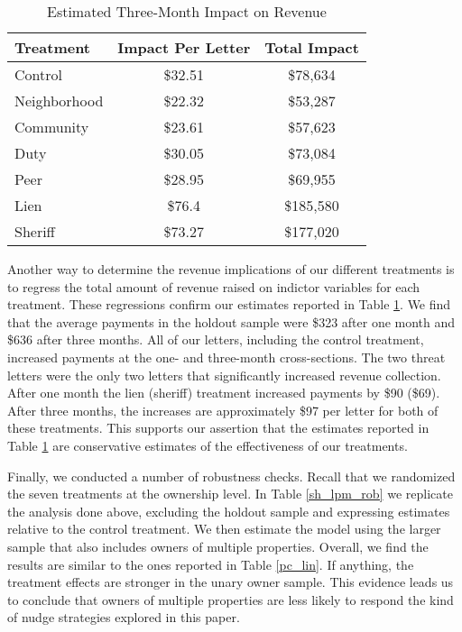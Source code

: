 \documentclass[12pt]{article}
\begin{document}
\begin{table}[htbp]
\caption{Estimated Three-Month Impact on Revenue}\label{sh_rev}
\bigskip
\centering
\begin{tabular}{lcc}
  \hline
Treatment & Impact Per Letter & Total Impact \\ 
  \hline
Control & \$32.51 & \$78,634 \\ 
  Neighborhood & \$22.32 & \$53,287 \\ 
  Community & \$23.61 & \$57,623 \\ 
  Duty & \$30.05 & \$73,084 \\ 
  Peer & \$28.95 & \$69,955 \\ 
  Lien & \$76.4 & \$185,580 \\ 
  Sheriff & \$73.27 & \$177,020 \\ 
   \hline
\end{tabular}
\end{table}

Another way to determine the revenue implications of our different
treatments is to regress the total amount of revenue raised on 
indictor variables for each treatment.  These regressions confirm our estimates
reported in Table \ref{sh_rev}. We find that the average payments in
the holdout sample were \$323 after one month and \$636 after three
months. All of our letters, including the control treatment, increased
payments at the one- and three-month cross-sections. The two threat letters
were the only two letters that significantly increased revenue
collection. After one month the lien (sheriff) treatment increased
payments by \$90 (\$69). After three months, the increases are
approximately \$97 per letter for both of these treatments. 
This supports our assertion 
that the estimates reported in Table \ref{sh_rev} are conservative
estimates of the effectiveness of our treatments.


Finally, we conducted a number of robustness checks. Recall that we
randomized the seven treatments at the ownership level. In Table
\ref{sh_lpm_rob} we replicate the analysis done above, excluding the
holdout sample and expressing estimates relative to the 
control treatment. We then estimate the model using the larger sample
that also includes owners of multiple properties. Overall, we find the
results are similar to the ones reported in Table \ref{pc_lin}. If
anything, the treatment effects are stronger in the unary owner
sample. This evidence leads us to conclude that owners of multiple properties are less
likely to respond the kind of nudge strategies explored in this paper.
\end{document}

